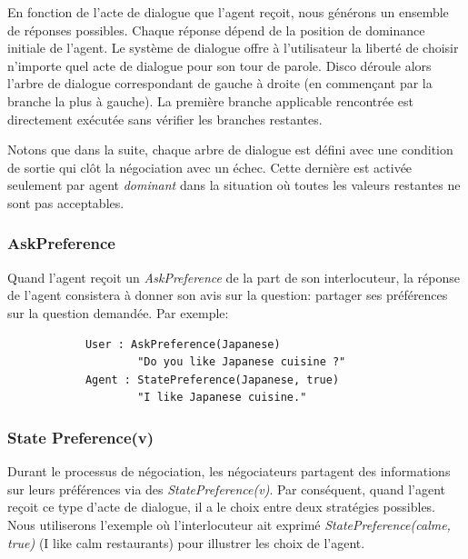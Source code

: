 	En fonction de l'acte de dialogue que l'agent reçoit, nous générons un ensemble de réponses possibles. Chaque réponse dépend de la position de dominance initiale de l'agent. Le système de dialogue offre à l'utilisateur la liberté de choisir n'importe quel acte de dialogue pour son tour de parole. Disco déroule alors l'arbre de dialogue correspondant de gauche à droite (en commençant par la branche la plus à gauche). La première branche applicable rencontrée est directement exécutée sans vérifier les branches restantes.
	
	Notons que dans la suite, chaque arbre de dialogue est défini avec une condition de sortie qui clôt la négociation avec un échec. Cette dernière est activée seulement par agent \emph{dominant} dans la situation où toutes les valeurs restantes ne sont pas acceptables. 
	
	\subsubsection{AskPreference}
		Quand l'agent reçoit un \emph{AskPreference} de la part de son interlocuteur, la réponse de l'agent consistera à donner son avis sur la question: partager ses préférences sur la question demandée. Par exemple: 
		
		\begin{verbatim}
			User : AskPreference(Japanese) 
					"Do you like Japanese cuisine ?"
			Agent : StatePreference(Japanese, true)
					"I like Japanese cuisine."
		\end{verbatim}
	

		 
		 
	\subsubsection{State Preference(v)}
		Durant le processus de négociation, les négociateurs partagent des informations sur leurs préférences via des \emph{StatePreference(v)}. Par conséquent, quand l'agent reçoit ce type d'acte de dialogue, il a le choix entre deux stratégies possibles. Nous utiliserons l'exemple où l'interlocuteur ait exprimé  \emph{StatePreference(calme, true)} (I like calm restaurants) pour illustrer les choix de l'agent. 
		
		
